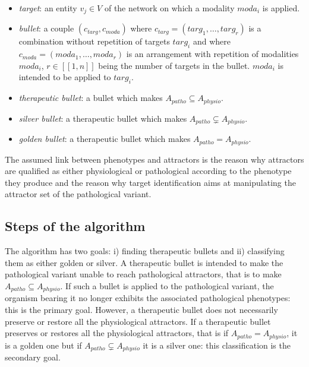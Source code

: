 \documentclass[oneside,a4paper,onecolumn,notitlepage]{article}
\begin{document}
\begin{itemize}
\item \emph{target}: an entity $v_j\in V$ of the network on which a modality $moda_i$ is applied.
\item \emph{bullet}: a couple $(c_{targ},c_{moda})$ where $c_{targ}=(targ_1,\dots,targ_r)$ is a combination without repetition of targets $targ_i$ and where $c_{moda}=(moda_1,\dots,moda_r)$ is an arrangement with repetition of modalities $moda_i$, $r\in [\![1,n]\!]$ being the number of targets in the bullet. $moda_i$ is intended to be applied to $targ_i$.
\item \emph{therapeutic bullet}: a bullet which makes $A_{patho}\subseteq A_{physio}$.
\item \emph{silver bullet}: a therapeutic bullet which makes $A_{patho}\varsubsetneq A_{physio}$.
\item \emph{golden bullet}: a therapeutic bullet which makes $A_{patho}=A_{physio}$.
\end{itemize}

The assumed link between phenotypes and attractors is the reason why attractors are qualified as either physiological or pathological according to the phenotype they produce and the reason why target identification aims at manipulating the attractor set of the pathological variant.

\subsection{Steps of the algorithm}
The algorithm has two goals: i) finding therapeutic bullets and ii) classifying them as either golden or silver. A therapeutic bullet is intended to make the pathological variant unable to reach pathological attractors, that is to make $A_{patho}\subseteq A_{physio}$. If such a bullet is applied to the pathological variant, the organism bearing it no longer exhibits the associated pathological phenotypes: this is the primary goal. However, a therapeutic bullet does not necessarily preserve or restore all the physiological attractors. If a therapeutic bullet preserves or restores all the physiological attractors, that is if $A_{patho}=A_{physio}$, it is a golden one but if $A_{patho}\varsubsetneq A_{physio}$ it is a silver one: this classification is the secondary goal.
\end{document}
